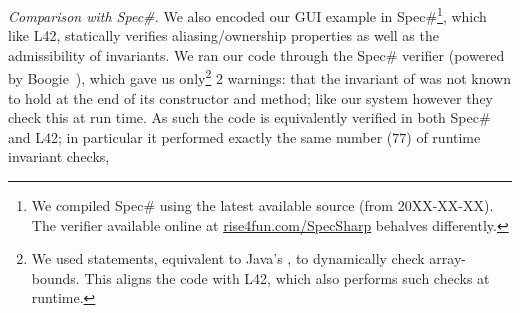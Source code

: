 

\textit{Comparison with Spec\#.}
We also encoded our GUI example in Spec\#\footnote{We compiled Spec\# using the latest available source (from 20XX-XX-XX). The verifier available online at \url{rise4fun.com/SpecSharp} behalves differently.}, which like L42, statically verifies aliasing/ownership properties as well as the admissibility of invariants.
We ran our code through the Spec\# verifier (powered by Boogie~\cite{?}), which gave us only\footnote{We used \Q@assume@ statements, equivalent to Java's \Q@assert@, to dynamically check array-bounds.%
This aligns the code with L42, which also performs such checks at runtime.} $2$ warnings: that the invariant of \Q@SafeMovable@ was not known to hold at the end of its constructor and \Q@dispatch@ method; like our system however they check this at run time. As such the code is equivalently verified in both Spec\# and L42; in particular it performed exactly the same number ($77$) of runtime invariant checks,



